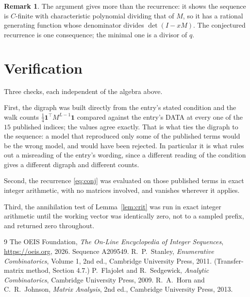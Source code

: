 \documentclass[11pt,a4paper]{article}
\theoremstyle{plain}
\theoremstyle{definition}
\newtheorem{remark}[theorem]{Remark}
\begin{document}
\begin{remark}
The argument gives more than the recurrence: it shows the sequence is $C$-finite with
characteristic polynomial dividing that of $M$, so it has a rational generating function
whose denominator divides $\det(I-xM)$. The conjectured recurrence is one consequence; the
minimal one is a divisor of $q$.
\end{remark}

\section{Verification}

Three checks, each independent of the algebra above.

First, the digraph was built directly from the entry's stated condition and the walk counts
$\tfrac1{4}\mathbf{1}^{\!\top}M^{L-1}\mathbf{1}$ compared against the entry's DATA at
every one of the $15$ published indices; the values agree exactly. That is what ties
the digraph to the sequence: a model that reproduced only some of the published terms would
be the wrong model, and would have been rejected. In particular it is what rules out a
misreading of the entry's wording, since a different reading of the condition gives a
different digraph and different counts.

Second, the recurrence \eqref{eq:conj} was evaluated on those published terms in exact
integer arithmetic, with no matrices involved, and vanishes wherever it applies.

Third, the annihilation test of Lemma~\ref{lem:crit} was run in exact integer arithmetic
until the working vector was identically zero, not to a sampled prefix, and returned zero
throughout.

\begin{thebibliography}{9}
 The OEIS Foundation, \emph{The On-Line Encyclopedia of Integer
Sequences}, \url{https://oeis.org}, 2026. Sequence A209549.
 R.~P.~Stanley, \emph{Enumerative Combinatorics}, Volume 1, 2nd ed.,
Cambridge University Press, 2011. (Transfer-matrix method, Section 4.7.)
 P.~Flajolet and R.~Sedgewick, \emph{Analytic Combinatorics}, Cambridge
University Press, 2009.
 R.~A.~Horn and C.~R.~Johnson, \emph{Matrix Analysis}, 2nd ed., Cambridge
University Press, 2013.
\end{thebibliography}
\end{document}
